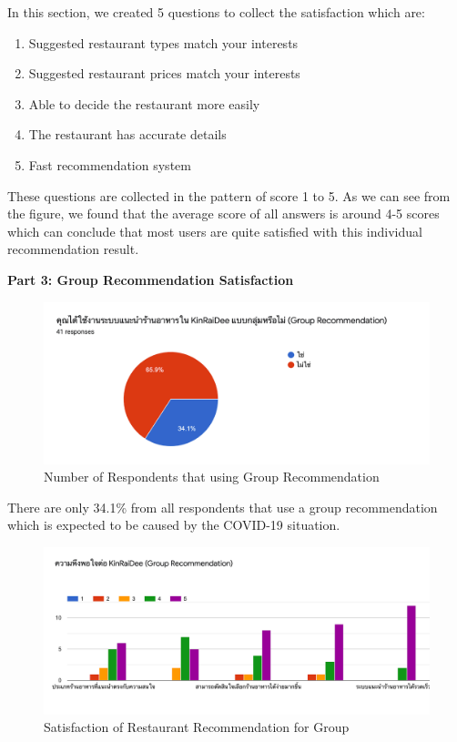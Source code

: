 \documentclass[12pt,oneside,openright,a4paper]{cpe-english-project}
\begin{document}
In this section, we created 5 questions to collect the satisfaction which are:
\begin{enumerate}
\item Suggested restaurant types match your interests
\item Suggested restaurant prices match your interests
\item Able to decide the restaurant more easily
\item The restaurant has accurate details
\item Fast recommendation system
\end{enumerate}

These questions are collected in the pattern of score 1 to 5. As we can see from the figure, we found that the average score of all answers is around 4-5 scores which can conclude that most users are quite satisfied with this individual recommendation result.

\newpage
\textbf{Part 3: Group Recommendation Satisfaction}

\begin{figure}[H]\centering
\includegraphics[width=350pt]{./images/A2NumberofRespondentsthatusingGroupRecommendation.png}
\caption{Number of Respondents that using Group Recommendation}\label{fig:A2NumberofRespondentsthatusingGroupRecommendation}
\end{figure}\vspace{-24pt}

There are only 34.1\% from all respondents that use a group recommendation which is expected to be caused by the COVID-19 situation.

\begin{figure}[H]\centering
\includegraphics[width=350pt]{./images/A2SatisfactionofRestaurantRecommendationforGroup.png}
\caption{Satisfaction of Restaurant Recommendation for Group}\label{fig:A2SatisfactionofRestaurantRecommendationforGroup}
\end{figure}\vspace{-24pt}
\end{document}
